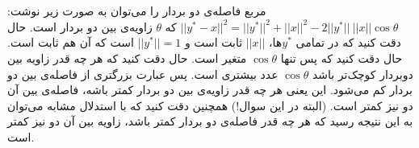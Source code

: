 \\\\
مربع فاصله‌ی دو بردار را می‌توان به صورت زیر نوشت:
$||y^*-x||^2=||y^*||^2+||x||^2-2 ||y^*||~||x|| \cos \theta$
که
$\theta$
زاویه‌ی بین دو بردار است.
حال دقت کنید که در تمامی
$y^*$ها،
$||x||$ ثابت است و
$||y^*||=1$ است که آن هم ثابت است.
حال دقت کنید که پس تنها
$\cos \theta$
متغیر است. حال دقت کنید که هر چه قدر زاویه بین دوبردار کوچک‌تر باشد
$\cos \theta$
عدد بیشتری است. پس عبارت بزرگتری از فاصله‌ی بین دو بردار کم می‌شود.
این یعنی هر چه قدر زاویه‌ی بین دو بردار کمتر باشه، فاصله‌ی بین آن دو نیز کمتر است.
(البته در این سوال!)
همچنین دقت کنید که با استدلال مشابه می‌توان به این نتیجه رسید که هر چه قدر
فاصله‌ی دو بردار کمتر باشد، زاویه‌ بین آن دو نیز کمتر است.